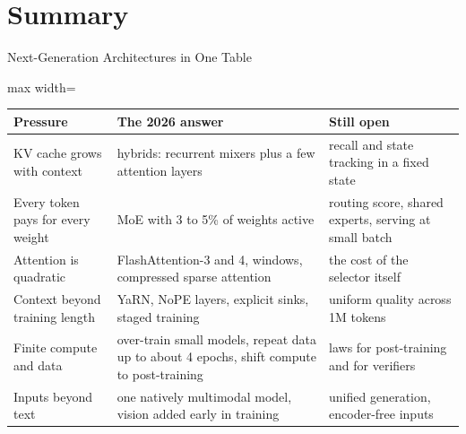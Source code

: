 \section{Summary}

\begin{frame}{Next-Generation Architectures in One Table}
    \begin{center}
    \footnotesize
    \renewcommand{\arraystretch}{1.15}
    \begin{adjustbox}{max width=\linewidth}\begin{tabular}{>{\raggedright\arraybackslash}p{2.9cm}>{\raggedright\arraybackslash}p{5.2cm}>{\raggedright\arraybackslash}p{5.2cm}}
        \toprule
        \textbf{Pressure} & \textbf{The 2026 answer} & \textbf{Still open} \\
        \midrule
        KV cache grows with context & hybrids: recurrent mixers plus a few attention layers & recall and state tracking in a fixed state \\
        Every token pays for every weight & MoE with 3 to 5\% of weights active & routing score, shared experts, serving at small batch \\
        Attention is quadratic & FlashAttention-3 and 4, windows, compressed sparse attention & the cost of the selector itself \\
        Context beyond training length & YaRN, NoPE layers, explicit sinks, staged training & uniform quality across 1M tokens \\
        Finite compute and data & over-train small models, repeat data up to about 4 epochs, shift compute to post-training & laws for post-training and for verifiers \\
        Inputs beyond text & one natively multimodal model, vision added early in training & unified generation, encoder-free inputs \\
        \bottomrule
    \end{tabular}\end{adjustbox}
    \end{center}
    \vspace{0.13em}
\end{frame}

